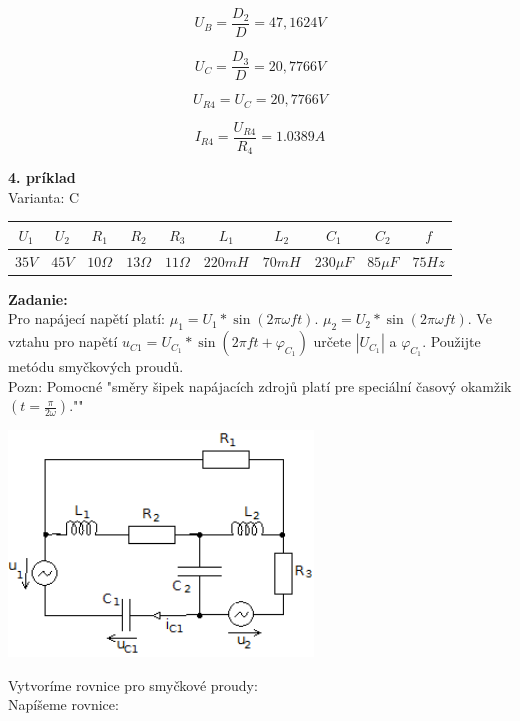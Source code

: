 \documentclass[a4paper,12pt]{article}
\begin{document}
\begin{equation*}
U_B = \frac{D_2}{D} = 47,1624 V
\end{equation*} 

\begin{equation*}
U_C = \frac{D_3}{D} = 20,7766 V
\end{equation*} 

\begin{equation*}
U_{R4} = U_C = 20,7766 V
\end{equation*} 

\begin{equation*}
I_{R4} = \frac{U_{R4}}{R_4} = 1.0389 A
\end{equation*} 



\newpage
\begin{flushleft}
\textbf{4. príklad}\\
Varianta: C
\end{flushleft}

\begin{tabular}{|c|c|c|c|c|c|c|c|c|c|}
\hline $U_1$ & $U_2$ & $R_1$ & $R_2$ & $R_3$ & $L_1$ & $L_2$ & $C_1$ & $C_2$  & $f$ \\ 
\hline
$35V$ & $45V$ & $10\Omega$ & $13\Omega$ & $11\Omega$ & $220mH$ & $70mH$ & $230\mu F$ & $85\mu F$ & $75Hz$ \\ 
\hline
\end{tabular}
\bigskip

\begin{flushleft}
\textbf{Zadanie:}\\
Pro napájecí napětí platí: $\mu_1 = U_1 * \sin (2\pi\omega ft)$. $\mu_2 = U_2 * \sin (2\pi\omega ft)$. Ve vztahu pro napětí $u_{C1} = U_{C_1} * \sin (2\pi ft + \varphi_{C_1})$ určete $|U_{C_1}|$ a $\varphi_{C_1}$. Použijte metódu smyčkových proudů.\\
Pozn: Pomocné "směry šipek napájacích zdrojů platí pre speciální časový okamžik $(t = \frac{\pi}{2\omega})$.""

\end{flushleft}
\bigskip



\includegraphics[height=6cm]{obrazky/pr4a}
\begin{flushleft}
Vytvoríme rovnice pro smyčkové proudy: \\
Napíšeme rovnice:
\end{flushleft}
\end{document}
